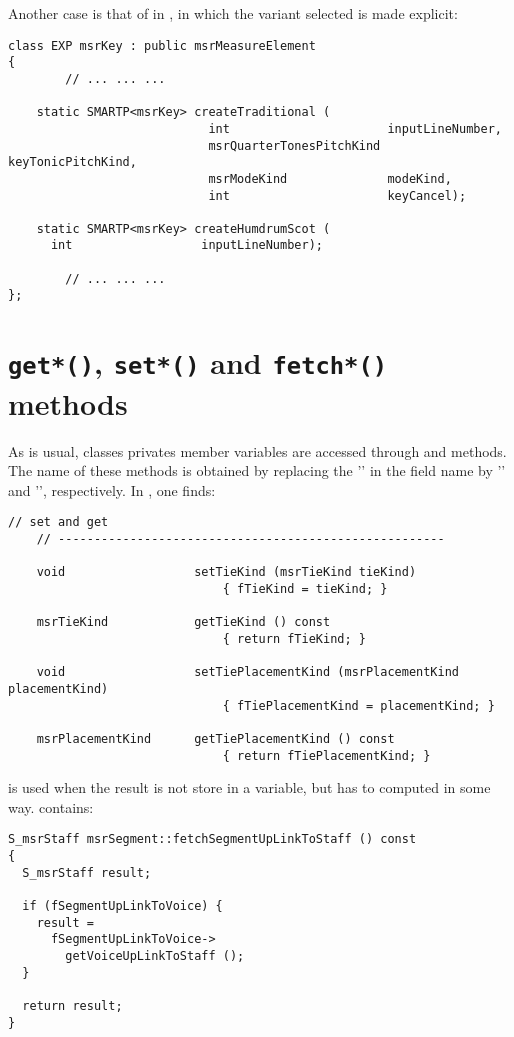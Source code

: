 Another case is that of  in , in which the variant selected is made explicit:
\begin{lstlisting}[language=CPlusPlus]
class EXP msrKey : public msrMeasureElement
{
		// ... ... ...

    static SMARTP<msrKey> createTraditional (
                            int                      inputLineNumber,
                            msrQuarterTonesPitchKind keyTonicPitchKind,
                            msrModeKind              modeKind,
                            int                      keyCancel);

    static SMARTP<msrKey> createHumdrumScot (
      int                  inputLineNumber);

		// ... ... ...
};
\end{lstlisting}


\section{{\tt get*()}, {\tt set*()} and {\tt fetch*()} methods}

As is usual, classes privates member variables are accessed through  and  methods. The name of these methods is obtained by replacing the '' in the field name by '' and '', respectively. In , one finds:
\begin{lstlisting}[language=CPlusPlus]
    // set and get
    // ------------------------------------------------------

    void                  setTieKind (msrTieKind tieKind)
                              { fTieKind = tieKind; }

    msrTieKind            getTieKind () const
                              { return fTieKind; }

    void                  setTiePlacementKind (msrPlacementKind placementKind)
                              { fTiePlacementKind = placementKind; }

    msrPlacementKind      getTiePlacementKind () const
                              { return fTiePlacementKind; }
\end{lstlisting}


 is used when the result is not store in a variable, but has to computed in some way.  contains:
\begin{lstlisting}[language=CPlusPlus]
S_msrStaff msrSegment::fetchSegmentUpLinkToStaff () const
{
  S_msrStaff result;

  if (fSegmentUpLinkToVoice) {
    result =
      fSegmentUpLinkToVoice->
        getVoiceUpLinkToStaff ();
  }

  return result;
}
\end{lstlisting}

